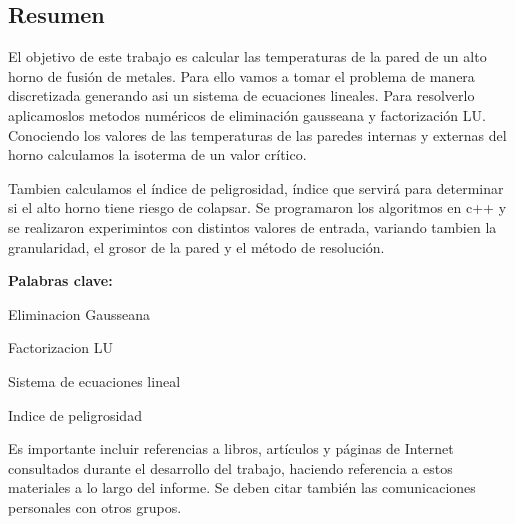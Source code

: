 \documentclass[11pt, a4paper, spanish]{article}
\let\strong\textbf
\theoremstyle{plain}
\theoremstyle{remark}
\begin{document}


\maketitle
\newpage

\begin{addmargin}[4em]{4em}

\section*{\centering Resumen}
  {El objetivo de este trabajo es calcular las temperaturas de la pared de un alto horno de fusión de metales. Para ello vamos a tomar el problema de manera discretizada generando asi un sistema de ecuaciones lineales. Para resolverlo aplicamoslos metodos numéricos de eliminación gausseana y factorización LU. Conociendo los valores de las temperaturas de las paredes internas y externas del horno calculamos la isoterma de un valor crítico. 

  Tambien calculamos el índice de peligrosidad, índice que servirá para determinar si el alto horno tiene riesgo de colapsar. Se programaron los algoritmos en c++ y se realizaron experimintos con distintos valores de entrada, variando tambien la granularidad, el grosor de la pared y el método de resolución.}

\vspace{4em}
\noindent \strong{Palabras clave:} {
Eliminacion Gausseana

Factorizacion LU

Sistema de ecuaciones lineal

Indice de peligrosidad}


\end{addmargin}
\clearpage

\tableofcontents
\clearpage


\clearpage


\clearpage

\clearpage

\clearpage

\clearpage


\clearpage

\printbibliography[heading=bibintoc]

  {\color{Gray} Es importante incluir referencias a libros, artículos y páginas de Internet consultados durante el desarrollo del trabajo, haciendo referencia a estos materiales a lo largo del informe.
  Se deben citar también las comunicaciones personales con otros grupos.}
\end{document}
